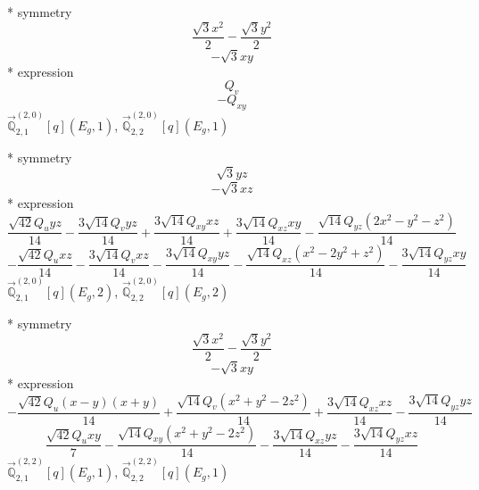 \documentclass[fleqn,8pt]{jsarticle}
\begin{document}
\noindent\quad ** symmetry
\begin{dmath*}
\frac{\sqrt{3} x^{2}}{2} - \frac{\sqrt{3} y^{2}}{2}
\end{dmath*}
\begin{dmath*}
- \sqrt{3} x y
\end{dmath*}
\noindent\quad ** expression
\begin{dmath*}
Q_{v}
\end{dmath*}
\begin{dmath*}
- Q_{xy}
\end{dmath*}
\noindent\quad $\vec{\mathbb{Q}}_{2,1}^{(2,0)}[q](E_{g},1)$, $\vec{\mathbb{Q}}_{2,2}^{(2,0)}[q](E_{g},1)$

\noindent\quad ** symmetry
\begin{dmath*}
\sqrt{3} y z
\end{dmath*}
\begin{dmath*}
- \sqrt{3} x z
\end{dmath*}
\noindent\quad ** expression
\begin{dmath*}
\frac{\sqrt{42} Q_{u} y z}{14} - \frac{3 \sqrt{14} Q_{v} y z}{14} + \frac{3 \sqrt{14} Q_{xy} x z}{14} + \frac{3 \sqrt{14} Q_{xz} x y}{14} - \frac{\sqrt{14} Q_{yz} \left(2 x^{2} - y^{2} - z^{2}\right)}{14}
\end{dmath*}
\begin{dmath*}
- \frac{\sqrt{42} Q_{u} x z}{14} - \frac{3 \sqrt{14} Q_{v} x z}{14} - \frac{3 \sqrt{14} Q_{xy} y z}{14} - \frac{\sqrt{14} Q_{xz} \left(x^{2} - 2 y^{2} + z^{2}\right)}{14} - \frac{3 \sqrt{14} Q_{yz} x y}{14}
\end{dmath*}
\noindent\quad $\vec{\mathbb{Q}}_{2,1}^{(2,0)}[q](E_{g},2)$, $\vec{\mathbb{Q}}_{2,2}^{(2,0)}[q](E_{g},2)$

\noindent\quad ** symmetry
\begin{dmath*}
\frac{\sqrt{3} x^{2}}{2} - \frac{\sqrt{3} y^{2}}{2}
\end{dmath*}
\begin{dmath*}
- \sqrt{3} x y
\end{dmath*}
\noindent\quad ** expression
\begin{dmath*}
- \frac{\sqrt{42} Q_{u} \left(x - y\right) \left(x + y\right)}{14} + \frac{\sqrt{14} Q_{v} \left(x^{2} + y^{2} - 2 z^{2}\right)}{14} + \frac{3 \sqrt{14} Q_{xz} x z}{14} - \frac{3 \sqrt{14} Q_{yz} y z}{14}
\end{dmath*}
\begin{dmath*}
\frac{\sqrt{42} Q_{u} x y}{7} - \frac{\sqrt{14} Q_{xy} \left(x^{2} + y^{2} - 2 z^{2}\right)}{14} - \frac{3 \sqrt{14} Q_{xz} y z}{14} - \frac{3 \sqrt{14} Q_{yz} x z}{14}
\end{dmath*}
\noindent\quad $\vec{\mathbb{Q}}_{2,1}^{(2,2)}[q](E_{g},1)$, $\vec{\mathbb{Q}}_{2,2}^{(2,2)}[q](E_{g},1)$
\end{document}
